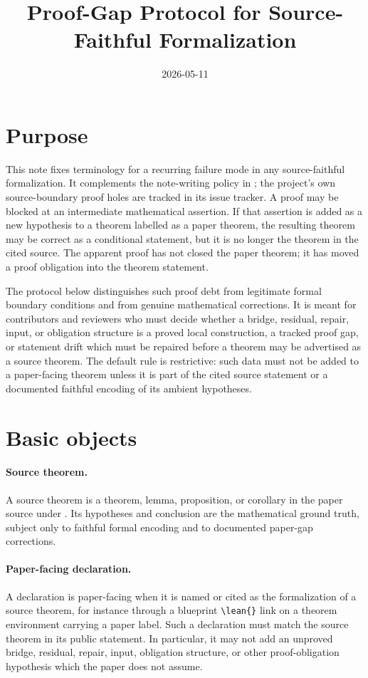\documentclass[11pt]{article}
\title{Proof-Gap Protocol for Source-Faithful Formalization}
\author{}
\date{2026-05-11}
\begin{document}
\maketitle

\section{Purpose}

This note fixes terminology for a recurring failure mode in any
source-faithful formalization.  It complements the note-writing policy in
; the project's own source-boundary proof
holes are tracked in its issue tracker.
A proof may be blocked at
an intermediate mathematical assertion.  If that assertion is added as a new
hypothesis to a theorem labelled as a paper theorem, the resulting \Lean{}
theorem
may be correct as a conditional statement, but it is no longer the theorem in
the cited source.  The apparent proof has not closed the paper theorem; it has
moved a proof obligation into the theorem statement.

The protocol below distinguishes such proof debt from legitimate formal
boundary conditions and from genuine mathematical corrections.  It is meant for
contributors and reviewers who must decide whether a bridge, residual, repair,
input, or obligation structure is a proved local construction, a tracked proof
gap, or statement drift which must be repaired before a theorem may be
advertised as a source theorem.  The default rule is restrictive: such data
must not be added to a paper-facing theorem unless it is part of the cited
source statement or a documented faithful encoding of its ambient hypotheses.

\section{Basic objects}

\paragraph{Source theorem.}
A source theorem is a theorem, lemma, proposition, or corollary in the paper
source under .  Its hypotheses and conclusion are
the mathematical ground truth, subject only to faithful formal encoding and to
documented paper-gap corrections.

\paragraph{Paper-facing declaration.}
A \Lean{} declaration is paper-facing when it is named or cited as the
formalization of a source theorem, for instance through a blueprint
\verb|\lean{}| link on a theorem environment carrying a paper label.  Such a
declaration must match the source theorem in its public statement.  In
particular, it may not add an unproved bridge, residual, repair, input,
obligation structure, or other proof-obligation hypothesis which the paper does
not assume.
\end{document}
